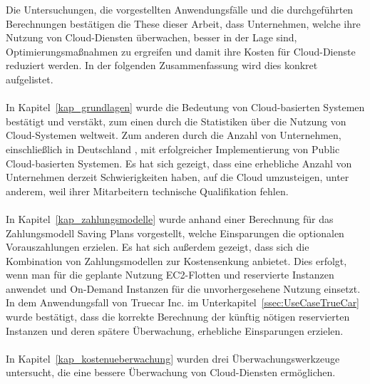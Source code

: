 Die Untersuchungen, die vorgestellten Anwendungsfälle und die durchgeführten Berechnungen bestätigen die These dieser Arbeit, dass Unternehmen, welche ihre Nutzung von Cloud-Diensten überwachen, besser in der Lage sind, Optimierungsmaßnahmen zu ergreifen und damit ihre Kosten für Cloud-Dienste reduziert werden. In der folgenden Zusammenfassung wird dies konkret aufgelistet.
\\\\
In Kapitel~\ref{kap_grundlagen} %
wurde die Bedeutung von Cloud-basierten Systemen bestätigt und verstäkt, zum einen durch die Statistiken %
über die Nutzung von Cloud-Systemen weltweit. Zum anderen durch die Anzahl von Unternehmen, einschließlich in Deutschland%
, mit erfolgreicher Implementierung von Public Cloud-basierten Systemen. Es hat sich gezeigt, dass eine erhebliche Anzahl von Unternehmen derzeit Schwierigkeiten haben, auf die Cloud umzusteigen, unter anderem, weil ihrer Mitarbeitern technische Qualifikation fehlen.
\\\\
In Kapitel~\ref{kap_zahlungsmodelle} wurde anhand einer Berechnung für das Zahlungsmodell Saving Plans vorgestellt, welche Einsparungen die optionalen Vorauszahlungen erzielen. Es hat sich außerdem gezeigt, dass sich die Kombination von Zahlungsmodellen zur Kostensenkung anbietet. Dies erfolgt, wenn man für die geplante Nutzung EC2-Flotten und reservierte Instanzen anwendet und On-Demand Instanzen für die unvorhergesehene Nutzung einsetzt. %
In dem Anwendungsfall von Truecar Inc. im Unterkapitel~\ref{ssec:UseCaseTrueCar} %
wurde bestätigt, dass die korrekte Berechnung der künftig nötigen reservierten Instanzen und deren spätere Überwachung, erhebliche Einsparungen erzielen.
\\\\
In Kapitel~\ref{kap_kostenueberwachung} wurden drei Überwachungswerkzeuge untersucht, die eine bessere Überwachung von Cloud-Diensten ermöglichen. %
